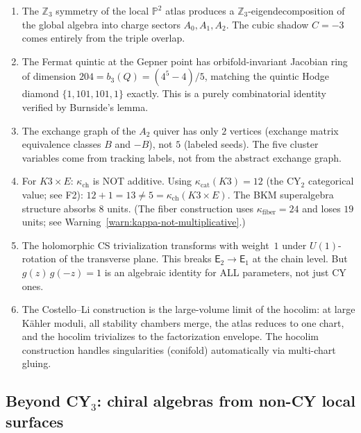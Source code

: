 \documentclass[11pt]{article}
\newcommand{\Z}{\mathbb{Z}}
\newcommand{\bP}{\mathbb{P}}
\newcommand{\Eone}{\mathsf{E}_1}
\newcommand{\Etwo}{\mathsf{E}_2}
\begin{document}
\begin{enumerate}[label=(\roman*)]
\item The $\Z_3$ symmetry of the local $\bP^2$ atlas produces a $\Z_3$-eigendecomposition of the
 global algebra into charge sectors $A_0, A_1, A_2$. The cubic shadow $C = -3$ comes entirely
 from the triple overlap.

\item The Fermat quintic at the Gepner point has orbifold-invariant Jacobian ring of dimension
 $204 = b_3(Q) = (4^5 - 4)/5$, matching the quintic Hodge diamond $\{1, 101, 101, 1\}$ exactly.
 This is a purely combinatorial identity verified by Burnside's lemma.

\item The exchange graph of the $A_2$ quiver has only $2$ vertices (exchange matrix equivalence
 classes $B$ and $-B$), not $5$ (labeled seeds). The five cluster variables come from tracking
 labels, not from the abstract exchange graph.

\item For $K3 \times E$: $\kappa_{\mathrm{ch}}$ is NOT additive. Using $\kappa_{\mathrm{cat}}(K3) = 12$ (the CY$_2$ categorical value; see F2): $12 + 1 = 13 \neq 5 = \kappa_{\mathrm{ch}}(K3 \times E)$.
 The BKM superalgebra structure absorbs $8$ units. (The fiber construction uses $\kappa_{\mathrm{fiber}} = 24$ and loses $19$ units; see Warning~\ref{warn:kappa-not-multiplicative}.)

\item The holomorphic CS trivialization transforms with weight~$1$ under $U(1)$-rotation of the
 transverse plane. This breaks $\Etwo \to \Eone$ at the chain level. But $g(z)\,g(-z) = 1$
 is an algebraic identity for ALL parameters, not just CY ones.

\item The Costello--Li construction is the large-volume limit of the hocolim: at large K\"ahler
 moduli, all stability chambers merge, the atlas reduces to one chart, and the hocolim trivializes
 to the factorization envelope. The hocolim construction handles singularities (conifold)
 automatically via multi-chart gluing.
\end{enumerate}

\subsection{Beyond CY$_3$: chiral algebras from non-CY local surfaces}
\label{subsec:non-cy-local-surfaces}
\end{document}
